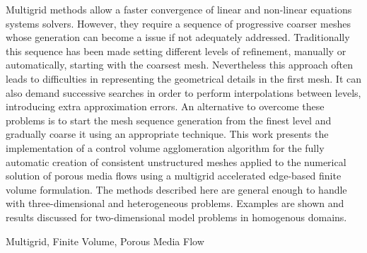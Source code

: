 Multigrid methods allow a faster convergence of linear and non-linear equations systems solvers. However, they require a sequence of progressive coarser meshes whose generation can become a issue if not adequately addressed. Traditionally this sequence has been made setting different levels of refinement, manually or automatically, starting with the coarsest mesh. Nevertheless this approach often leads to difficulties in representing the geometrical details in the first mesh. It can also demand successive searches in order to perform interpolations between levels, introducing extra approximation errors. An alternative to overcome these problems is to start the mesh sequence generation from the finest level and gradually coarse it using an appropriate technique. This work presents the implementation of a control volume agglomeration algorithm for the fully automatic creation of consistent unstructured meshes applied to the numerical solution of porous media flows using a multigrid accelerated edge-based finite volume formulation. The methods described here are general enough to handle with three-dimensional and heterogeneous problems. Examples are shown and results discussed for two-dimensional model problems in homogenous domains.

\begin{keywords}
Multigrid, Finite Volume, Porous Media Flow
\end{keywords}
